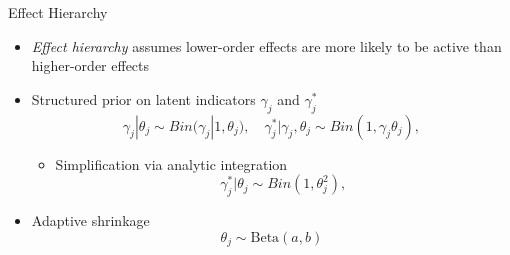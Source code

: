 \documentclass[
  ignorenonframetext,
  aspectratio=169]{beamer}
\providecommand{\tightlist}{%
  \setlength{\itemsep}{0pt}\setlength{\parskip}{0pt}}
\newcommand{\tp}{*}
\begin{document}
\begin{frame}{Effect Hierarchy}
\protect\hypertarget{effect-hierarchy}{}
\begin{itemize}
\item
  \emph{Effect hierarchy} assumes lower-order effects are more likely to
  be active than higher-order effects
\item
  Structured prior on latent indicators \(\gamma_j\) and
  \(\gamma^\tp_{j}\) \[
  \gamma_{j} | \theta_j \sim Bin(\gamma_{j}|1, \theta_j),\quad
  \gamma_{j}^\tp | \gamma_{j}, \theta_j \sim Bin(1, \gamma_{j}\theta_j),
  \]

  \begin{itemize}
  \tightlist
  \item
    Simplification via analytic integration \[
    \gamma_{j}^\tp | \theta_j \sim Bin(1, \theta_j^2),
    \]
  \end{itemize}
\item
  Adaptive shrinkage \[
  \theta_j \sim \text{Beta}(a,b)
  \]
\end{itemize}
\end{frame}
\end{document}
